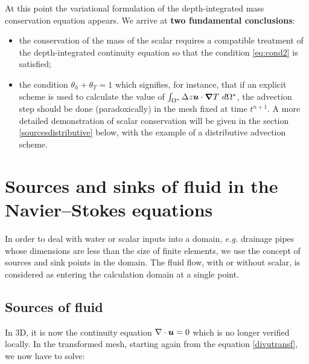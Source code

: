 At this point the variational formulation of the depth-integrated mass
conservation equation appears.
We arrive at \textbf{two fundamental conclusions}:
\begin{itemize}
\item the conservation of the mass of the scalar requires a compatible
treatment of the depth-integrated continuity equation so that the condition
\eqref{eq:cond2} is satisfied;
\item the condition $\theta_{h}+\theta_{T}=1$ which signifies,
for instance, that if an explicit scheme is used to calculate
the value of $\int_{\Omega^{\ast}}\Delta z\bm{u}\cdot\bm{\nabla} T~d\Omega^{\ast}$,
the advection step should be done (paradoxically) in the
mesh fixed at time $t^{n+1}$. A more detailed demonstration of scalar
conservation will be given in the section \ref{sourcesdistributive}
below, with the example of a distributive advection scheme.
\end{itemize}

\section{\label{sources3d}Sources and sinks of fluid in the Navier--Stokes equations}

In order to deal with water or scalar inputs into a domain, \textit{e.g.} drainage pipes whose dimensions are less than the size of finite elements, we use the concept of sources and sink points in the domain.
The fluid flow, with or without scalar, is considered as entering
the calculation domain at a single point.

\subsection{\label{sourcesoffluid}Sources of fluid}

In 3D, it is now the continuity equation $\nabla \cdot \bm{u}=0$ which is
no longer verified locally. In the transformed mesh, starting again from
the equation \ref{divutransf}, we now have to solve:%


